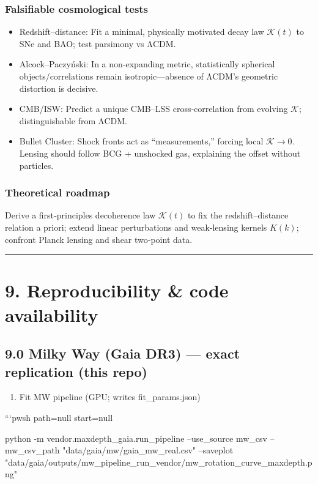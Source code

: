 \documentclass[11pt,a4paper]{article}
\begin{document}
\subsubsection{Falsifiable cosmological tests}


\begin{itemize}
\item Redshift–distance: Fit a minimal, physically motivated decay law $\mathcal{K}(t)$ to SNe and BAO; test parsimony vs ΛCDM.
\item Alcock–Paczyński: In a non‑expanding metric, statistically spherical objects/correlations remain isotropic—absence of ΛCDM’s geometric distortion is decisive.
\item CMB/ISW: Predict a unique CMB–LSS cross‑correlation from evolving $\mathcal{K}$; distinguishable from ΛCDM.
\item Bullet Cluster: Shock fronts act as “measurements,” forcing local $\mathcal{K}\to0$. Lensing should follow BCG + unshocked gas, explaining the offset without particles.
\end{itemize}


\subsubsection{Theoretical roadmap}


Derive a first‑principles decoherence law $\mathcal{K}(t)$ to fix the redshift–distance relation a priori; extend linear perturbations and weak‑lensing kernels $K(k)$; confront Planck lensing and shear two‑point data.


\medskip\hrule\medskip


\section{9. Reproducibility \& code availability}


\subsection{9.0 Milky Way (Gaia DR3) — exact replication (this repo)}


\begin{enumerate}
\item Fit MW pipeline (GPU; writes fit\_params.json)
\end{enumerate}

```pwsh path=null start=null

python -m vendor.maxdepth\_gaia.run\_pipeline --use\_source mw\_csv --mw\_csv\_path "data/gaia/mw/gaia\_mw\_real.csv" --saveplot "data/gaia/outputs/mw\_pipeline\_run\_vendor/mw\_rotation\_curve\_maxdepth.png"
\end{document}
